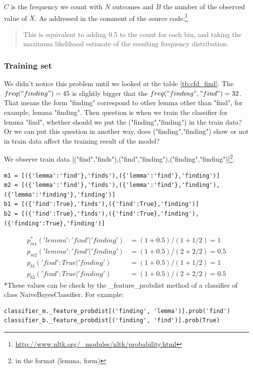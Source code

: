 \documentclass[a4paper]{article}
\begin{document}
$C$ is the frequency we count with $N$ outcomes and $B$ the number of the observed value of $X$. As addressed in the comment of the source code:\footnote{\url{http://www.nltk.org/_modules/nltk/probability.html}}
\begin{quotation}
This is equivalent to adding 0.5 to the count for each bin, and taking the maximum likelihood estimate of the resulting frequency distribution.
\end{quotation}




\subsubsection{Training set}

We didn't notice this problem until we looked at the table \ref{tb:cfd_find}. The $freq("finding")=45$ is slightly bigger that the $freq("finding","find")=32$. That means the form "finding" correspond to other lemma other than "find", for example, lemma "finding". Then question is when we train the classifier for lemma "find", whether should we put the ("finding","finding") in the train data? Or we can put this question in another way, does ("finding","finding") show or not in train data affect the training result of the model?

We observe train data [("find","finds"),("find","finding"),("finding","finding")]\footnote{in the format (lemma, form)}. 
\begin{lstlisting}
m1 = [({'lemma':'find'},'finds'),({'lemma':'find'},'finding')]
m2 = [({'lemma':'find'},'finds'),({'lemma':'find'},'finding'),({'lemma':'finding'},'finding')]
b1 = [({'find':True},'finds'),({'find':True},'finding')]
b2 = [({'find':True},'finds'),({'find':True},'finding'),({'finding':True},'finding')]
\end{lstlisting}
\begin{align*}
p_{m1}^*('lemma':'find'|'finding')&=(1+0.5)/(1+1/2)=1 \\
p_{m2}('lemma':'find'|'finding')&=(1+0.5)/(2+2/2)=0.5 \\
p_{b1}('find':True|'finding')&=(1+0.5)/(1+1/2)=1 \\
p_{b2}('find':True|'finding')&=(1+0.5)/(2+2/2)=0.5
\end{align*}
*These values can be check by the \_feature\_probdist method of a classifier of class NaiveBayesClassifier. For example:
\begin{lstlisting}
classifier_m._feature_probdist[('finding', 'lemma')].prob('find')
classifier_b._feature_probdist[('finding', 'find')].prob(True)
\end{lstlisting}
\end{document}
